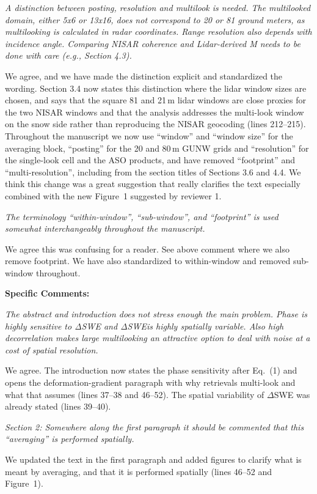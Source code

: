 \documentclass[tc, manuscript]{copernicus}
\begin{document}
\textit{A distinction between posting, resolution and multilook is needed. The multilooked domain, either 5x6 or 13x16, does not correspond to 20 or 81 ground meters, as multilooking is calculated in radar coordinates. Range resolution also depends with incidence angle. Comparing NISAR coherence and Lidar-derived M needs to be done with care (e.g., Section 4.3).}

We agree, and we have made the distinction explicit and standardized the wording. Section 3.4 now states this distinction where the lidar window sizes are chosen, and says that the square 81 and 21\,m lidar windows are close proxies for the two NISAR windows and that the analysis addresses the multi-look window on the snow side rather than reproducing the NISAR geocoding (lines 212--215). Throughout the manuscript we now use ``window'' and ``window size'' for the averaging block, ``posting'' for the 20 and 80\,m GUNW grids and ``resolution'' for the single-look cell and the ASO products, and have removed ``footprint'' and ``multi-resolution'', including from the section titles of Sections 3.6 and 4.4. We think this change was a great suggestion that really clarifies the text especially combined with the new Figure~1 suggested by reviewer 1.

\textit{The terminology “within-window”, “sub-window”, and “footprint” is used somewhat interchangeably throughout the manuscript.}

We agree this was confusing for a reader. See above comment where we also remove footprint. We have also standardized to within-window and removed sub-window throughout.

\textbf{Specific Comments:}


\textit{The abstract and introduction does not stress enough the main problem. Phase is highly sensitive to ΔSWE and ΔSWEis highly spatially variable. Also high decorrelation makes large multilooking an attractive option to deal with noise at a cost of spatial resolution.}

We agree. The introduction now states the phase sensitivity after Eq.~(1) and opens the deformation-gradient paragraph with why retrievals multi-look and what that assumes (lines 37--38 and 46--52). The spatial variability of $\Delta$SWE was already stated (lines 39--40).


\textit{Section 2: Somewhere along the first paragraph it should be commented that this “averaging” is performed spatially.}

We updated the text in the first paragraph and added figures to clarify what is meant by averaging, and that it is performed spatially (lines 46--52 and Figure~1).
\end{document}
